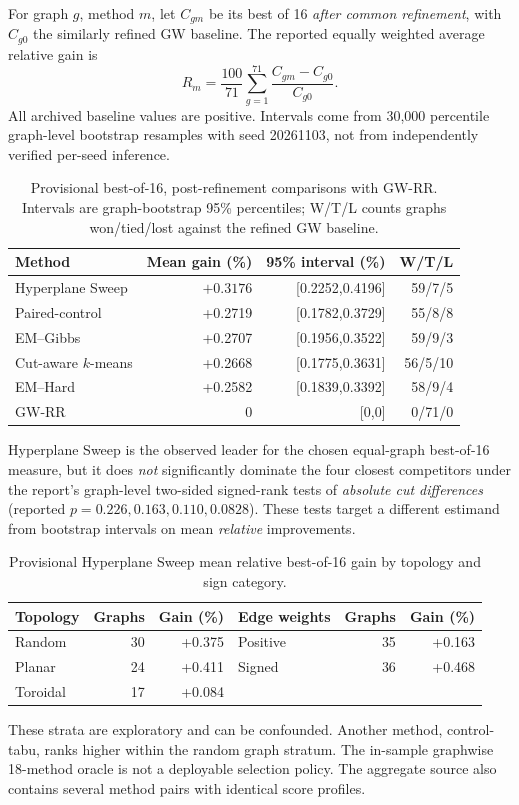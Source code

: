 \documentclass[10pt,letterpaper]{article}
\begin{document}
For graph \(g\), method \(m\), let \(C_{gm}\) be its best of 16 \emph{after common refinement}, with \(C_{g0}\) the similarly refined GW baseline. The reported equally weighted average relative gain is
\begin{equation}\label{eq:measure}
R_m=\frac{100}{71}\sum_{g=1}^{71}\frac{C_{gm}-C_{g0}}{C_{g0}}.
\end{equation}
All archived baseline values are positive. Intervals come from 30,000 percentile graph-level bootstrap resamples with seed 20261103, not from independently verified per-seed inference.

\begin{table}[t]
\centering\small
\caption{Provisional best-of-16, post-refinement comparisons with GW-RR. Intervals are graph-bootstrap 95\% percentiles; W/T/L counts graphs won/tied/lost against the refined GW baseline.}
\label{tab:results}
\begin{tabular}{lrrr}
\toprule
Method & Mean gain (\%) & 95\% interval (\%) & W/T/L\\
\midrule
Hyperplane Sweep & \(\mathbf{+0.3176}\) & [0.2252,0.4196] & 59/7/5\\
Paired-control & +0.2719 & [0.1782,0.3729] & 55/8/8\\
EM--Gibbs & +0.2707 & [0.1956,0.3522] & 59/9/3\\
Cut-aware \(k\)-means & +0.2668 & [0.1775,0.3631] & 56/5/10\\
EM--Hard & +0.2582 & [0.1839,0.3392] & 58/9/4\\
GW-RR & 0 & [0,0] & 0/71/0\\
\bottomrule
\end{tabular}
\end{table}
Hyperplane Sweep is the observed leader for the chosen equal-graph best-of-16 measure, but it does \emph{not} significantly dominate the four closest competitors under the report's graph-level two-sided signed-rank tests of \emph{absolute cut differences} (reported \(p=0.226,0.163,0.110,0.0828\)). These tests target a different estimand from bootstrap intervals on mean \emph{relative} improvements.

\begin{table}[t]
\centering\small
\caption{Provisional Hyperplane Sweep mean relative best-of-16 gain by topology and sign category.}
\label{tab:family}
\begin{tabular}{lrr@{\qquad}lrr}
\toprule
Topology & Graphs & Gain (\%) & Edge weights & Graphs & Gain (\%)\\
\midrule
Random & 30 & +0.375 & Positive & 35 & +0.163\\
Planar & 24 & +0.411 & Signed & 36 & +0.468\\
Toroidal & 17 & +0.084 & & &\\
\bottomrule
\end{tabular}
\end{table}
These strata are exploratory and can be confounded. Another method, control-tabu, ranks higher within the random graph stratum. The in-sample graphwise 18-method oracle is not a deployable selection policy. The aggregate source also contains several method pairs with identical score profiles.
\end{document}

